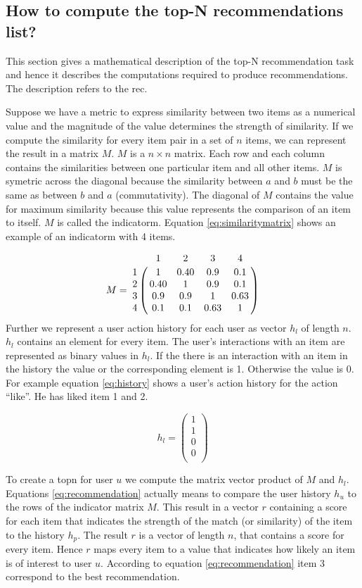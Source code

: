 \subsection{How to compute the top-N recommendations list?}
\label{sec:problem}
This section gives a mathematical description of the top-N recommendation task and hence it describes the computations required to produce recommendations. The description refers to the \gls{rec}.

Suppose we have a metric to express similarity between two items as a numerical value and the magnitude of the value determines the strength of similarity. If we compute the similarity for every item pair in a set of $n$ items, we can represent the result in a matrix $M$. $M$ is a $n \times n$ matrix. Each row and each column contains the similarities between one particular item and all other items. $M$ is symetric across the diagonal because the similarity between $a$ and $b$ must be the same as between $b$ and $a$ (commutativity). The diagonal of $M$ contains the value for maximum similarity because this value represents the comparison of an item to itself. $M$ is called the \gls{indicatorm}. Equation \ref{eq:similaritymatrix} shows an example of an \gls{indicatorm} with 4 items.

\begin{equation}
  \label{eq:similaritymatrix}
M =\bordermatrix{~ & 1 & 2 & 3 & 4 \cr
 1 & 1  & 0.40 & 0.9 & 0.1 \cr
2 & 0.40 &1  & 0.9 & 0.1 \cr
 3& 0.9 & 0.9 &1  & 0.63 \cr
 4 & 0.1 & 0.1 & 0.63 &1  \cr}
\end{equation}
Further we represent a user action history for each user as vector $h_l$ of length $n$. $h_l$ contains an element for every item. The user's interactions with an item are represented as binary values in $h_l$. If the there is an interaction with an item in the history the value or the corresponding element is 1. Otherwise the value is 0. For example equation \ref{eq:history} shows a user's action history for the action ``like''. He has liked item 1 and 2.

\begin{equation}
\label{eq:history}
h_l =
\begin{pmatrix}
 1 \\
 1 \\
 0 \\
 0 \\
\end{pmatrix}
\end{equation}

To create a \gls{topn} for user $u$ we compute the matrix vector product of $M$ and $h_l$. Equations \ref{eq:recommendation} actually means to compare the user history $h_u$ to the rows of the indicator matrix $M$. This result in a vector $r$ containing a score for each item that indicates the strength of the match (or similarity) of the item to the history $h_p$. The result $r$ is a vector of length $n$, that contains a score for every item. Hence $r$ maps every item to a value that indicates how likely an item is of interest to user $u$. According to equation \ref{eq:recommendation} item 3 correspond to the best recommendation.

